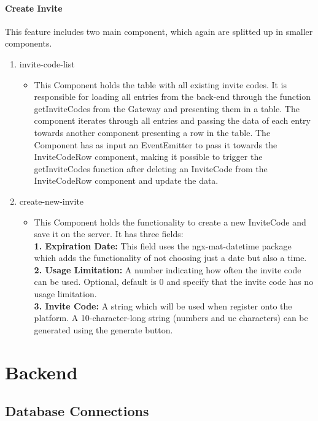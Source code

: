 \paragraph{Create Invite}
This feature includes two main component, which again are splitted up in smaller components.

\begin{enumerate}
\item invite-code-list
	\begin{itemize}
		\item This Component holds the table with all existing invite codes. It is responsible for loading all entries from the back-end through the function getInviteCodes from the Gateway and presenting them in a table. The component iterates through all entries and passing the data of each entry towards another component presenting a row in the table. The Component has as input an EventEmitter to pass it towards the InviteCodeRow component, making it possible to trigger the getInviteCodes function after deleting an InviteCode from the InviteCodeRow component and update the data.
	\end{itemize}
\item create-new-invite
	\begin{itemize}
		\item This Component holds the functionality to create a new InviteCode and save it on the server. It has three fields: \\  
		\textbf{1.	Expiration Date:} This field uses the ngx-mat-datetime package which adds the functionality of not choosing just a date but also a time. \\
		\textbf{2.	Usage Limitation:} A number indicating how often the invite code can be used. Optional, default is 0 and specify that the invite code has no usage limitation. \\
		\textbf{3.	Invite Code:} A string which will be used when register onto the platform. A 10-character-long string (numbers and uc characters) can be generated using the generate button.\\	
	\end{itemize}	
\end{enumerate}

\section{Backend}\label{sec:backend}


\subsection{Database Connections}\label{subsec:database-connections}

